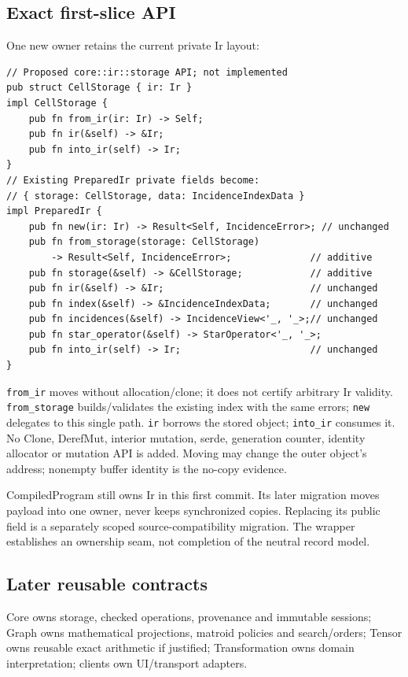 \documentclass[10pt,a4paper]{article}
\newcommand{\code}[1]{{\small\nolinkurl{#1}}}
\begin{document}
\subsection{Exact first-slice API}
One new owner retains the current private Ir layout:
\begin{lstlisting}
// Proposed core::ir::storage API; not implemented
pub struct CellStorage { ir: Ir }
impl CellStorage {
    pub fn from_ir(ir: Ir) -> Self;
    pub fn ir(&self) -> &Ir;
    pub fn into_ir(self) -> Ir;
}
// Existing PreparedIr private fields become:
// { storage: CellStorage, data: IncidenceIndexData }
impl PreparedIr {
    pub fn new(ir: Ir) -> Result<Self, IncidenceError>; // unchanged
    pub fn from_storage(storage: CellStorage)
        -> Result<Self, IncidenceError>;              // additive
    pub fn storage(&self) -> &CellStorage;            // additive
    pub fn ir(&self) -> &Ir;                          // unchanged
    pub fn index(&self) -> &IncidenceIndexData;       // unchanged
    pub fn incidences(&self) -> IncidenceView<'_, '_>;// unchanged
    pub fn star_operator(&self) -> StarOperator<'_, '_>;
    pub fn into_ir(self) -> Ir;                       // unchanged
}
\end{lstlisting}
\code{from_ir} moves without allocation/clone; it does not certify arbitrary Ir validity. \code{from_storage} builds/validates the existing index with the same errors; \code{new} delegates to this single path. \code{ir} borrows the stored object; \code{into_ir} consumes it. No Clone, DerefMut, interior mutation, serde, generation counter, identity allocator or mutation API is added. Moving may change the outer object's address; nonempty buffer identity is the no-copy evidence.

CompiledProgram still owns Ir in this first commit. Its later migration moves payload into one owner, never keeps synchronized copies. Replacing its public field is a separately scoped source-compatibility migration. The wrapper establishes an ownership seam, not completion of the neutral record model.

\subsection{Later reusable contracts}
Core owns storage, checked operations, provenance and immutable sessions; Graph owns mathematical projections, matroid policies and search/orders; Tensor owns reusable exact arithmetic if justified; Transformation owns domain interpretation; clients own UI/transport adapters.
\end{document}
